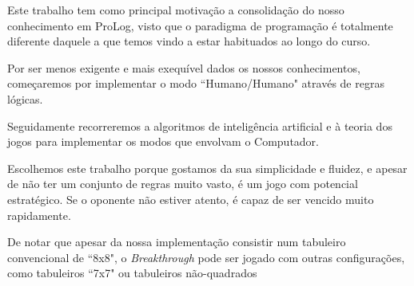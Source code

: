 \documentclass[15pt,a4paper]{article}
\begin{document}
Este trabalho tem como principal motivação a consolidação do nosso conhecimento em ProLog, visto que o paradigma de programação é totalmente diferente daquele a que temos vindo a estar habituados ao longo do curso.

Por ser menos exigente e mais exequível dados os nossos conhecimentos, começaremos por implementar o modo ``Humano/Humano" através de regras lógicas.

Seguidamente recorreremos a algoritmos de inteligência artificial e à teoria dos jogos para implementar os modos que envolvam o Computador.


Escolhemos este trabalho porque gostamos da sua simplicidade e fluidez, e apesar de não ter um conjunto de regras muito vasto, é um jogo com potencial estratégico. 
Se o oponente não estiver atento, é capaz de ser vencido muito rapidamente.

De notar que apesar da nossa implementação consistir num tabuleiro convencional de ``8x8", o \textit{Breakthrough} pode ser jogado com outras configurações, como tabuleiros ``7x7" ou tabuleiros não-quadrados











\end{document}
